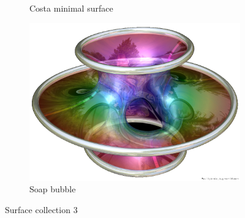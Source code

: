\begin{figure}
\begin{subfigure}{0.5\textwidth}
    \caption{Costa minimal surface}
\end{subfigure}
\begin{subfigure}{0.4\textwidth}
    \centering
    \includegraphics[width=\textwidth]{picture/week4/Costa-large.png}
    \caption{Soap bubble}
\end{subfigure}
\caption*{Surface collection 3}
\end{figure}

